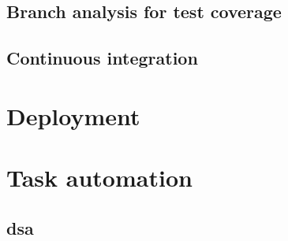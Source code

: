 \cite{woodward1980experience, gupta2000generating}

\subsection{Branch analysis for test coverage}



\subsection{Continuous integration}



\section{Deployment}


\cite{fowler2006continuous, duvall2007continuous}


\section{Task automation}


\subsection{dsa}



